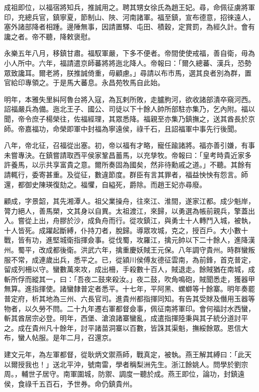 \begin{pinyinscope}
成祖即位，以福宿將知兵，推誠用之。聘其甥女徐氏為趙王妃。尋，命佩征虜將軍印，充總兵官，鎮寧夏，節制山、陜、河南諸軍。福至鎮，宣布德意，招徠遠人，塞外諸部降者相踵。邊陲無事，因請置驛、屯田、積穀，定賞罰，為經久計。會有讒之者。帝不聽，降敕褒慰。

永樂五年八月，移鎮甘肅。福馭軍嚴，下多不便者。帝間使使戒福，善自衛，毋為小人所中。六年，福請遣京師蕃將將迤北降人。帝報曰：「爾久總蕃、漢兵，恐勢眾致讒耳。爾老將，朕推誠倚重，毋顧慮。」尋請以布市馬，選其良者別為群，置官給印專領之。于是馬大蕃息。永昌苑牧馬自此始。

明年，本雅失里糾阿魯台將入寇，為瓦剌所敗，走臚朐河，欲收諸部潰卒窺河西。詔福嚴兵為備。迤北王子、國公、司徒以下十餘人帥所部駐亦集乃，乞內附。福以聞，帝令庶子楊榮往，佐福經理，其眾悉降。福親至亦集乃鎮撫之，送其酋長於京師。帝嘉福功，命榮即軍中封福為寧遠侯，祿千石，且詔福軍中事先行後聞。

八年，帝北征，召福從出塞。初，帝以福有才略，寵任踰諸將。福亦善引嫌，有事未嘗專決。在鎮嘗請取西平侯家鞏昌蓄馬，以充孳牧。帝報曰：「皇考時貴近家多許養馬，以示共享富貴之意。爾所奏固為國矣，然非待勳戚之道。」不聽。其餘有請輒行，委寄甚重。及從征，數違節度。群臣有言其罪者，福益怏怏有怨言。師還，都御史陳瑛復劾之。福懼，自縊死，爵除。而趙王妃亦尋廢。

顧成，字景韶，其先湘潭人。祖父業操舟，往來江、淮間，遂家江都。成少魁岸，膂力絕人，善馬槊，文其身以自異。太祖渡江，來歸，以勇選為帳前親兵，擎蓋出入。嘗從上出，舟膠於沙，成負舟而行。從攻鎮江，與勇士十人轉鬥入城，被執，十人皆死。成躍起斷縛，仆持刀者，脫歸。導眾攻城，克之，授百戶。大小數十戰，皆有功，進堅城衛指揮僉事。從伐蜀，攻羅江，擒元帥以下二十餘人，進降漢州。蜀平，改成都後衛。洪武六年，擒重慶妖賊王元保。八年調守貴州。時群蠻叛服不常，成連歲出兵，悉平之。已，從潁川侯傅友德征雲南，為前鋒，首克普定，留成列柵以守。蠻數萬來攻，成出柵，手殺數十百人，賊退走。餘賊猶在南城，成斬所俘而縱其一，曰：「吾夜二鼓來殺汝。」夜二鼓，吹角鳴砲，賊聞悉走，獲器甲無算。進指揮使。諸蠻隸普定者悉平。十七年，平阿黑、螺螄等十餘寨。明年奏罷普定府，析其地為三州、六長官司。進貴州都指揮同知。有告其受賕及僭用玉器等物者，以久勞不問。二十九年遷右軍都督僉事，佩征南將軍印。會何福討水西蠻，斬其酋居宗必登。明年，西堡、滄浪諸寨蠻亂，成遣指揮陸秉與其子統分道討平之。成在貴州凡十餘年，討平諸苗洞寨以百數，皆誅其渠魁，撫綏餘眾。恩信大布，蠻人帖服。是年二月，召還京。

建文元年，為左軍都督，從耿炳文禦燕師，戰真定，被執。燕王解其縛曰：「此天以爾授我也！」送北平沖，號南雷，學者稱梨洲先生。浙江餘姚人。問學於劉宗周。，輔世子居守。南軍圍城，防禦、調度一聽於成。燕王即位，論功，封鎮遠侯，食祿千五百石，予世券。命仍鎮貴州。


\end{pinyinscope}
